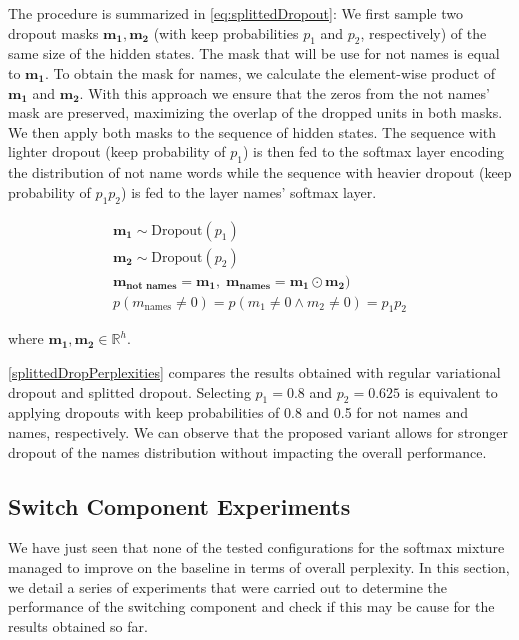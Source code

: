 The procedure is summarized in \autoref{eq:splittedDropout}: We first sample two dropout masks $\mathbf{m_1},\mathbf{m_2}$ (with keep probabilities $p_1$ and $p_2$, respectively) of the same size of the hidden states. The mask that will be use for not names is equal to $\mathbf{m_1}$. To obtain the mask for names, we calculate the element-wise product of $\mathbf{m_1}$ and $\mathbf{m_2}$. With this approach we ensure that the zeros from the not names' mask are preserved, maximizing the overlap of the dropped units in both masks. We then apply both masks to the sequence of hidden states. The sequence with lighter dropout (keep probability of $p_1$) is then fed to the softmax layer encoding the distribution of not name words while the sequence with heavier dropout (keep probability of $p_1p_2$) is fed to the layer names' softmax layer.

\begin{equation} \label{eq:splittedDropout}
\begin{gathered}
	\mathbf{m_1} \sim \text{Dropout}(p_1) \\
	\mathbf{m_2} \sim \text{Dropout}(p_2) \\
	\mathbf{m_{\text{not names}}} = \mathbf{m_1}, \; \mathbf{m_{\text{names}}} = \mathbf{m_1} \odot \mathbf{m_2}) \\
	p(m_{\text{names}} \neq 0) = p(m_1 \neq 0 \wedge m_2 \neq 0) = p_1 p_2
\end{gathered}
\end{equation}

where $\mathbf{m_1},\mathbf{m_2} \in \mathbb{R}^h$.

\autoref{splittedDropPerplexities} compares the results obtained with regular variational dropout and splitted dropout. Selecting $p_1=0.8$ and $p_2=0.625$ is equivalent to applying dropouts with keep probabilities of 0.8 and 0.5 for not names and names, respectively. We can observe that the proposed variant allows for stronger dropout of the names distribution without impacting the overall performance.

\subsection{Switch Component Experiments}

We have just seen that none of the tested configurations for the softmax mixture managed to improve on the baseline in terms of overall perplexity. In this section, we detail a series of experiments that were carried out to determine the performance of the switching component and check if this may be cause for the results obtained so far.

